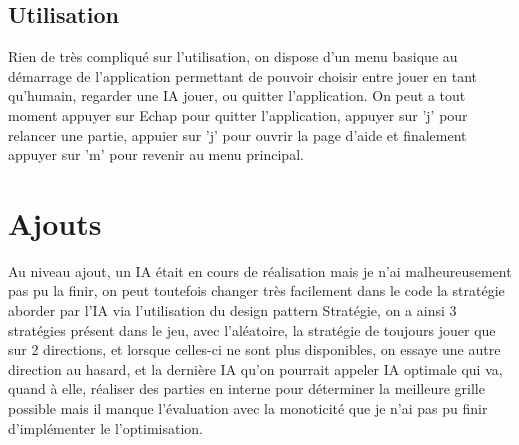 \documentclass[a4paper]{article}
\begin{document}
\subsection{Utilisation}

Rien de très compliqué sur l'utilisation, on dispose d'un menu basique au démarrage de l'application permettant de pouvoir choisir entre jouer en tant qu'humain, regarder une IA jouer, ou quitter l'application.
On peut a tout moment appuyer sur Echap pour quitter l'application, appuyer sur 'j' pour relancer une partie, appuier sur 'j' pour ouvrir la page d'aide et finalement appuyer sur 'm' pour revenir au menu principal.

\section{Ajouts}

Au niveau ajout, un IA était en cours de réalisation mais je n'ai malheureusement pas pu la finir, on peut toutefois changer très facilement dans le code la stratégie aborder par l'IA via l'utilisation du design pattern Stratégie, on a ainsi 3 stratégies présent dans le jeu, avec l'aléatoire, la stratégie de toujours jouer que sur 2 directions, et lorsque celles-ci ne sont plus disponibles, on essaye une autre direction au hasard, et la dernière IA qu'on pourrait appeler IA optimale qui va, quand à elle, réaliser des parties en interne pour déterminer la meilleure grille possible mais il manque l'évaluation avec la monoticité que je n'ai pas pu finir d'implémenter le l'optimisation.
\end{document}
